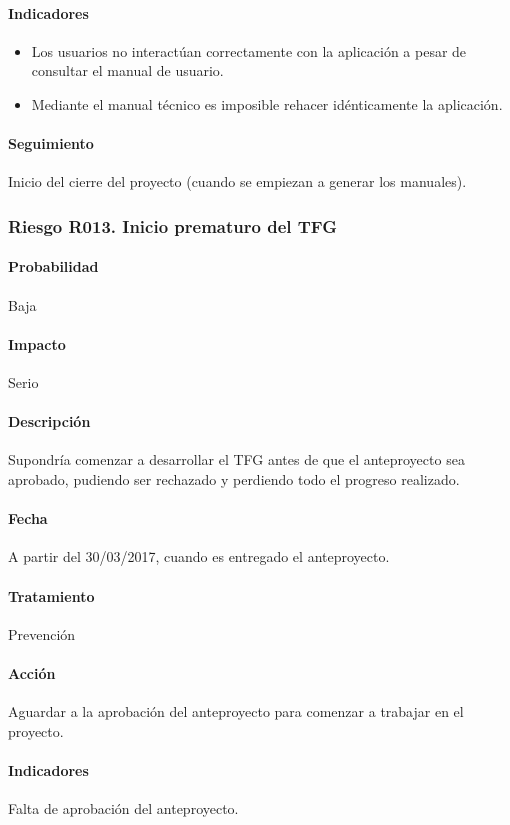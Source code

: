 \documentclass[10pt,a4paper]{article}
\begin{document}
				\paragraph{Indicadores} 
				\begin{itemize}
				    \item Los usuarios no interactúan correctamente con la aplicación a pesar de consultar el manual de usuario.
				    \item Mediante el manual técnico es imposible rehacer idénticamente la aplicación.
				\end{itemize}				 
				\paragraph{Seguimiento}	Inicio del cierre del proyecto (cuando se empiezan a generar los manuales).
				
			\subsubsection{Riesgo R013. Inicio prematuro del TFG}
				\paragraph{Probabilidad} Baja
				\paragraph{Impacto}	Serio
				\paragraph{Descripción} Supondría comenzar a desarrollar el TFG antes de que el anteproyecto sea aprobado, pudiendo ser rechazado y perdiendo todo el progreso realizado.
				\paragraph{Fecha} A partir del 30/03/2017, cuando es entregado el anteproyecto.
				\paragraph{Tratamiento} Prevención
				\paragraph{Acción} Aguardar a la aprobación del anteproyecto para comenzar a trabajar en el proyecto.
				\paragraph{Indicadores} Falta de aprobación del anteproyecto.
\end{document}
